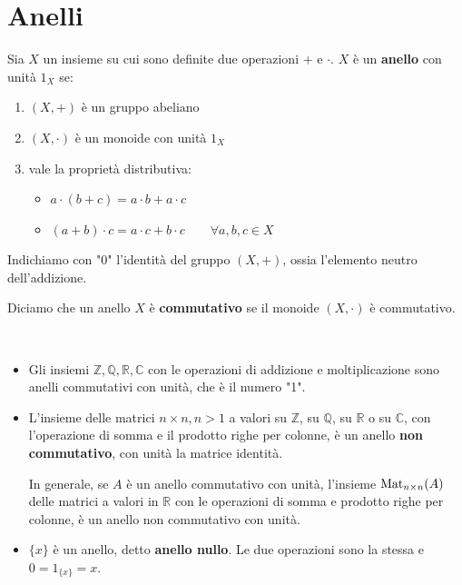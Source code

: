 \documentclass[../main.tex]{subfiles}
\begin{document}
\section{Anelli}

\begin{definition}[Anello]
    Sia $X$ un insieme su cui sono definite due operazioni $+$ e $\cdot $. $X$ è un \textbf{anello} con unità $1_X$ se:
    \begin{enumerate}[label=(\roman*)]
        \item $(X, +)$ è un gruppo abeliano
        \item $(X, \cdot)$ è un monoide con unità $1_X$
        \item vale la proprietà distributiva:
              \begin{itemize}
                  \item $a \cdot (b+c) = a \cdot b + a \cdot c$
                  \item $(a+b) \cdot c = a \cdot c + b \cdot c \qquad \forall a,b,c \in X$
              \end{itemize}
    \end{enumerate}
    Indichiamo con "$0$" l'identità del gruppo $(X, +)$, ossia l'elemento neutro dell'addizione.
\end{definition}

\begin{definition}
    Diciamo che un anello $X$ è \textbf{commutativo} se il monoide $(X, \cdot)$ è commutativo.
\end{definition}



\begin{example}
    \
    \begin{itemize}
        \item Gli insiemi $\mathbb{Z} ,\mathbb{Q} ,\mathbb{R} ,\mathbb{C} $ con le operazioni di addizione e moltiplicazione sono anelli commutativi con unità, che è il numero "1".
        \item L'insieme delle matrici $n \times n, n> 1$ a valori su $\mathbb{Z} $, su $\mathbb{Q} $, su $\mathbb{R}$ o su $\mathbb{C} $, con l'operazione di somma e il prodotto righe per colonne, è un anello \textbf{non commutativo}, con unità la matrice identità.

              In generale, se $A$ è un anello commutativo con unità, l'insieme $\operatorname{Mat}_{n \times n}(A)$ delle matrici a valori in $\mathbb{R} $ con le operazioni di somma e prodotto righe per colonne, è un anello non commutativo con unità.
        \item$\{x\}$ è un anello, detto \textbf{anello nullo}. Le due operazioni sono la stessa e $0 = 1_{\{x\}} = x$.
    \end{itemize}
\end{example}
\end{document}
